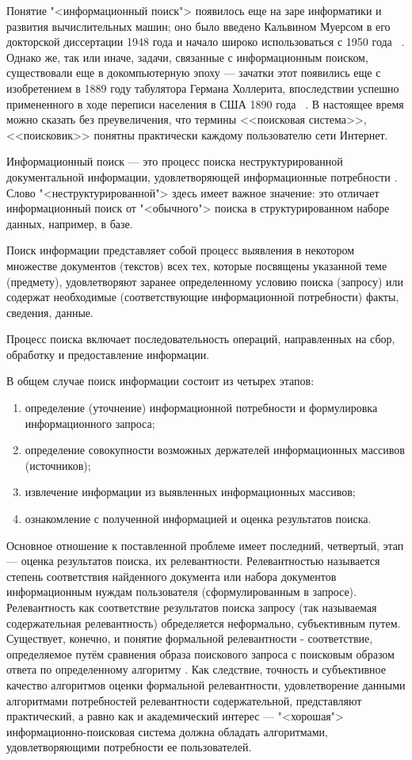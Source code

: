 Понятие "<информационный поиск"> появилось еще на заре информатики и развития вычислительных машин; оно было
введено Кальвином Муерсом в его докторской диссертации 1948 года и начало широко использоваться с 1950 года
~\cite{mooers1950theory, mooers1950information}. Однако же, так или иначе, задачи, связанные с информационным
поиском, существовали еще в докомпьютерную эпоху --- зачатки этот появились еще с изобретением в 1889 году
табулятора Германа Холлерита, впоследствии успешно примененного в ходе переписи населения в США 1890 года
~\cite{hollerith2011}. В настоящее время можно сказать без преувеличения, что термины <<поисковая система>>, 
<<поисковик>> понятны практически каждому пользователю сети Интернет.

Информационный поиск --- это процесс поиска неструктурированной документальной информации, удовлетворяющей
информационные потребности \cite{manning2011wwedenie}. Слово "<неструктурированной"> здесь имеет важное значение:
это отличает информационный поиск от "<обычного"> поиска в структурированном наборе данных, например, в базе.

Поиск информации представляет собой процесс выявления в некотором множестве документов (текстов) всех тех,
которые посвящены указанной теме (предмету), удовлетворяют заранее определенному условию поиска (запросу)
или содержат необходимые (соответствующие информационной потребности) факты, сведения, данные.

Процесс поиска включает последовательность операций, направленных на сбор, обработку и предоставление информации.

В общем случае поиск информации состоит из четырех этапов:
\begin{enumerate}[1)]
    \item определение (уточнение) информационной потребности и формулировка информационного запроса;
    \item определение совокупности возможных держателей информационных массивов (источников);
    \item извлечение информации из выявленных информационных массивов;
    \item ознакомление с полученной информацией и оценка результатов поиска.
\end{enumerate}

Основное отношение к поставленной проблеме имеет последний, четвертый, этап --- оценка результатов поиска,
их релевантности. Релевантностью называется степень соответствия найденного документа или набора документов
информационным нуждам пользователя (сформулированным в запросе). Релевантность как соответствие результатов
поиска запросу (так называемая содержательная релевантность) обределяется неформально, субъективным путем.
Существует, конечно, и понятие формальной релевантности - соответствие, определяемое путём сравнения образа
поискового запроса с поисковым образом ответа по определенному алгоритму \cite{mihalevich1989slowarj}.
Как следствие, точность и субъективное качество алгоритмов оценки формальной релевантности, удовлетворение
данными алгоритмами потребностей релевантности содержательной, представляют практический, а равно
как и академический интерес --- "<хорошая"> информационно-поисковая система должна обладать алгоритмами,
удовлетворяющими потребности ее пользователей.

